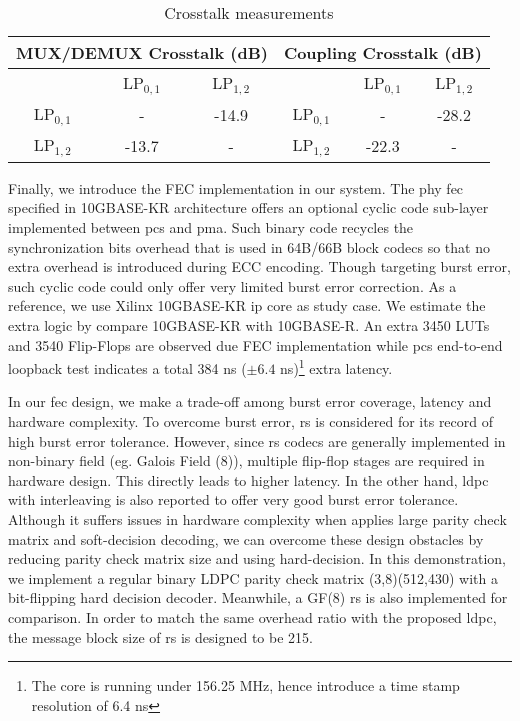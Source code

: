 \begin{table}[h]
\centering
\caption{Crosstalk measurements}
\label{tab:xtalk}
\footnotesize
\begin{tabular}{|c|c|c|c|c|c|}
\hline
\multicolumn{3}{|c|}{MUX/DEMUX Crosstalk (dB)} & \multicolumn{3}{c|}{Coupling Crosstalk (dB)} \\ \hline
               & LP$_{0,1}$    & LP$_{1,2}$    &               & LP$_{0,1}$    & LP$_{1,2}$   \\ \hline
LP$_{0,1}$     & -             & -14.9         & LP$_{0,1}$    & -             & -28.2        \\ \hline
LP$_{1,2}$     & -13.7         & -             & LP$_{1,2}$    & -22.3         & -            \\ \hline
\end{tabular}
\end{table}

Finally, we introduce the FEC implementation in our system. The \ac{phy} \ac{fec} specified in 10GBASE-KR architecture offers an optional cyclic code sub-layer implemented between \ac{pcs} and \ac{pma}. Such binary code recycles the synchronization bits overhead that is used in 64B/66B block codecs so that no extra overhead is introduced during ECC encoding. Though targeting burst error, such cyclic code could only offer very limited burst error correction\cite{szczepanek200610gbase}. As a reference, we use Xilinx 10GBASE-KR \ac{ip} core as study case. We estimate the extra logic by compare 10GBASE-KR with 10GBASE-R. An extra 3450 LUTs and 3540 Flip-Flops are observed due FEC implementation while \ac{pcs} end-to-end loopback test indicates a total 384 ns ($\pm 6.4$ ns)\footnote{The core is running under 156.25 MHz, hence introduce a time stamp resolution of 6.4 ns} extra latency.

In our \ac{fec} design, we make a trade-off among burst error coverage, latency and hardware complexity. To overcome burst error, \ac{rs} is considered for its record of high burst error tolerance. However, since \ac{rs} codecs are generally implemented in non-binary field (eg. Galois Field (8)), multiple flip-flop stages are required in hardware design. This directly leads to higher latency. In the other hand, \ac{ldpc} with interleaving is also reported to offer very good burst error tolerance. Although it suffers issues in hardware complexity when applies large parity check matrix and soft-decision decoding, we can overcome these design obstacles by reducing parity check matrix size and using hard-decision. In this demonstration, we implement a regular binary LDPC parity check matrix (3,8)(512,430) with a bit-flipping hard decision decoder. Meanwhile, a GF(8) \ac{rs} is also implemented for comparison. In order to match the same overhead ratio with the proposed \ac{ldpc}, the message block size of \ac{rs} is designed to be 215.

